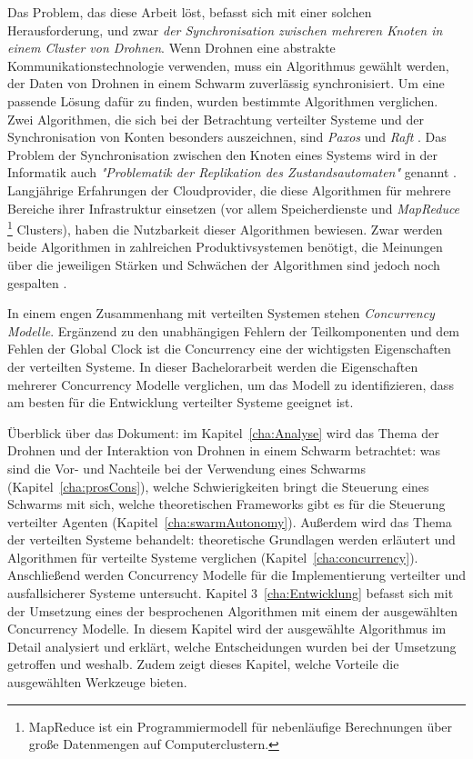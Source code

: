 Das Problem, das diese Arbeit löst, befasst sich mit einer solchen Herausforderung, und zwar \textit{der Synchronisation zwischen mehreren Knoten in einem Cluster von Drohnen}. Wenn Drohnen eine abstrakte Kommunikationstechnologie verwenden, muss ein Algorithmus gewählt werden, der Daten von Drohnen in einem Schwarm zuverlässig synchronisiert. Um eine passende Lösung dafür zu finden, wurden bestimmte Algorithmen verglichen. Zwei Algorithmen, die sich bei der Betrachtung verteilter Systeme und der Synchronisation von Konten besonders auszeichnen, sind \textit{Paxos} \cite{Lamport98thepart-time} und \textit{Raft} \cite{Ongaro14insearch}. Das Problem der Synchronisation zwischen den Knoten eines Systems wird in der Informatik auch \textit{"Problematik der Replikation des Zustandsautomaten"} genannt \cite{Lamport98thepart-time}. Langjährige Erfahrungen der Cloudprovider, die diese Algorithmen für mehrere Bereiche ihrer Infrastruktur einsetzen (vor allem Speicherdienste und \textit{MapReduce} \footnote{MapReduce ist ein Programmiermodell für nebenläufige Berechnungen über große Datenmengen auf Computerclustern.} Clusters), haben die Nutzbarkeit dieser Algorithmen bewiesen. Zwar werden beide Algorithmen in zahlreichen Produktivsystemen benötigt, die Meinungen über die jeweiligen Stärken und Schwächen der Algorithmen sind jedoch noch gespalten \cite{Hunt_zookeeper:wait-free}.

In einem engen Zusammenhang mit verteilten Systemen stehen \textit{Concurrency Modelle}. Ergänzend zu den unabhängigen Fehlern der Teilkomponenten \cite{Défago04totalorder} und dem Fehlen der Global Clock \cite{Défago04totalorder} ist die Concurrency eine der wichtigsten Eigenschaften der verteilten Systeme. In dieser Bachelorarbeit werden die Eigenschaften mehrerer Concurrency Modelle verglichen, um das Modell zu identifizieren, dass am besten für die Entwicklung verteilter Systeme geeignet ist.

Überblick über das Dokument: im Kapitel~\ref{cha:Analyse} wird das Thema der Drohnen und der Interaktion von Drohnen in einem Schwarm betrachtet: was sind die Vor- und Nachteile bei der Verwendung eines Schwarms (Kapitel~\ref{cha:prosCons}), welche Schwierigkeiten bringt die Steuerung eines Schwarms mit sich, welche theoretischen Frameworks gibt es für die Steuerung verteilter Agenten (Kapitel~\ref{cha:swarmAutonomy}). Außerdem wird das Thema der verteilten Systeme behandelt: theoretische Grundlagen werden erläutert und Algorithmen für verteilte Systeme verglichen (Kapitel~\ref{cha:concurrency}). Anschließend werden Concurrency Modelle für die Implementierung verteilter und ausfallsicherer Systeme untersucht. Kapitel 3~\ref{cha:Entwicklung} befasst sich mit der Umsetzung eines der besprochenen Algorithmen mit einem der ausgewählten Concurrency Modelle. In diesem Kapitel wird der ausgewählte Algorithmus im Detail analysiert und erklärt, welche Entscheidungen wurden bei der Umsetzung getroffen und weshalb. Zudem zeigt dieses Kapitel, welche Vorteile die ausgewählten Werkzeuge bieten.
